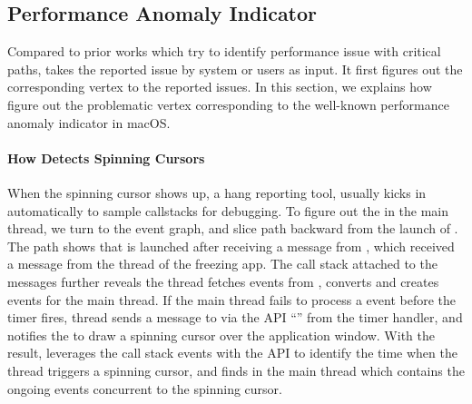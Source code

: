 
\subsection{Performance Anomaly Indicator} \label{subsec:indicator}

Compared to prior works which try to identify performance issue with critical
paths, \xxx takes the reported issue by system or users as input. It first
figures out the corresponding vertex to the reported issues. In this section,
we explains how \xxx figure out the problematic vertex corresponding to the
well-known performance anomaly indicator in macOS.

\paragraph{How \xxx Detects Spinning Cursors}

When the spinning cursor shows up, a hang reporting tool, \spindump usually
kicks in automatically to sample callstacks for debugging. To figure out the
\spinningnode in the main thread, we turn to the event graph, and slice path
backward from the launch of \spindump. The path shows that \spindump is launched
after receiving a message from , which received a message
from the  thread of the freezing app. The call stack attached to
the messages further reveals the  thread fetches 
events from , converts and creates  events for the main
thread. If the main thread fails to process a  event before the timer
fires,  thread sends a message to  via the API
``'' from the timer handler, and 
notifies the  to draw a spinning cursor over the application
window. With the result, \xxx leverages the call stack events with the API to
identify the time when the  thread triggers a spinning cursor,
and finds \spinningnode in the main thread which contains the ongoing events
concurrent to the spinning cursor.
